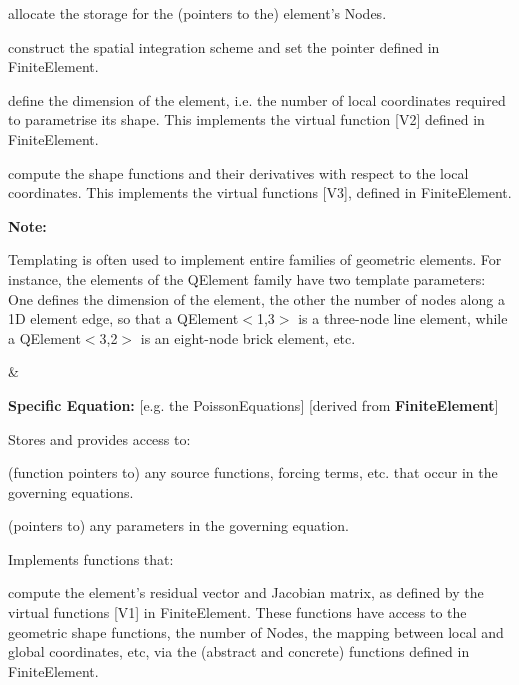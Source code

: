 \begin{center}
\begin{TabularC}{1}
\begin{TabularC}{2}
\begin{DoxyItemize}
\begin{DoxyItemize}
\item allocate the storage for the (pointers to the) element's {\ttfamily Nodes}.
\item construct the spatial integration scheme and set the pointer defined in {\ttfamily Finite\-Element}.
\item define the dimension of the element, i.\-e. the number of local coordinates required to parametrise its shape. This implements the virtual function \mbox{[}V2\mbox{]} defined in {\ttfamily Finite\-Element}.
\item compute the shape functions and their derivatives with respect to the local coordinates. This implements the virtual functions \mbox{[}V3\mbox{]}, defined in {\ttfamily Finite\-Element}.
\end{DoxyItemize}
\end{DoxyItemize}{\bfseries Note\-:}
\begin{DoxyItemize}
\item Templating is often used to implement entire families of geometric elements. For instance, the elements of the {\ttfamily Q\-Element} family have two template parameters\-: One defines the dimension of the element, the other the number of nodes along a 1\-D element edge, so that a {\ttfamily Q\-Element$<$1,3$>$} is a three-\/node line element, while a {\ttfamily Q\-Element$<$3,2$>$} is an eight-\/node brick element, etc.  
\end{DoxyItemize}&\begin{center} {\bfseries Specific Equation\-:} \mbox{[}e.\-g. the {\ttfamily Poisson\-Equations}\mbox{]} \newline
 \mbox{[}derived from {\bfseries Finite\-Element}\mbox{]} \end{center} 
\begin{DoxyItemize}
\item Stores and provides access to\-:
\begin{DoxyItemize}
\item (function pointers to) any source functions, forcing terms, etc. that occur in the governing equations.
\item (pointers to) any parameters in the governing equation.
\end{DoxyItemize}
\item Implements functions that\-:
\begin{DoxyItemize}
\item compute the element's residual vector and Jacobian matrix, as defined by the virtual functions \mbox{[}V1\mbox{]} in {\ttfamily Finite\-Element}. These functions have access to the geometric shape functions, the number of {\ttfamily Nodes}, the mapping between local and global coordinates, etc, via the (abstract and concrete) functions defined in {\ttfamily Finite\-Element}.

\end{DoxyItemize}
\end{DoxyItemize}
\end{TabularC}
\end{TabularC}
\end{center}
